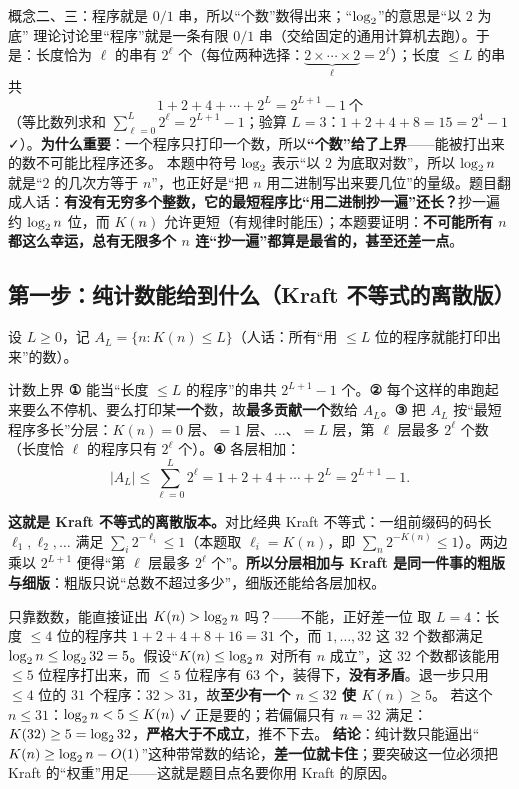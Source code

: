\documentclass[11pt,a4paper]{ctexart}
\begin{document}
\begin{defbox}{概念二、三：程序就是 $0/1$ 串，所以“个数”数得出来；“$\log_{2}$”的意思是“以 $2$ 为底”}
理论讨论里“程序”就是一条有限 $0/1$ 串（交给固定的通用计算机去跑）。于是：长度恰为 $\ell$ 的串有 $2^{\ell}$ 个（每位两种选择：$\underbrace{2\times\cdots\times2}_{\ell}=2^{\ell}$）；长度 $\le L$ 的串共
\[
1+2+4+\cdots+2^{L}=2^{L+1}-1\ \text{个}
\]
（等比数列求和 $\sum_{\ell=0}^{L}2^{\ell}=2^{L+1}-1$；验算 $L=3$：$1+2+4+8=15=2^{4}-1$ ✓）。\textbf{为什么重要}：一个程序只打印一个数，所以\textbf{“个数”给了上界}——能被打出来的数不可能比程序还多。
本题中符号 $\log_{2}$ 表示“以 $2$ 为底取对数”，所以 $\log_{2} n$ 就是“$2$ 的几次方等于 $n$”，也正好是“把 $n$ 用二进制写出来要几位”的量级。题目翻成人话：\textbf{有没有无穷多个整数，它的最短程序比“用二进制抄一遍”还长？}抄一遍约 $\log_{2} n$ 位，而 $K(n)$ 允许更短（有规律时能压）；本题要证明：\textbf{不可能所有 $n$ 都这么幸运，总有无限多个 $n$ 连“抄一遍”都算是最省的，甚至还差一点}。
\end{defbox}

\subsection{第一步：纯计数能给到什么（Kraft 不等式的离散版）}

设 $L\ge0$，记 $A_L=\{n: K(n)\le L\}$（人话：所有“用 $\le L$ 位的程序就能打印出来”的数）。

\begin{calc}{计数上界}
\textbf{①} 能当“长度 $\le L$ 的程序”的串共 $2^{L+1}-1$ 个。\textbf{②} 每个这样的串跑起来要么不停机、要么打印某\textbf{一个}数，故\textbf{最多贡献一个}数给 $A_L$。\textbf{③} 把 $A_L$ 按“最短程序多长”分层：$K(n)=0$ 层、$=1$ 层、$\dots$、$=L$ 层，第 $\ell$ 层最多 $2^{\ell}$ 个数（长度恰 $\ell$ 的程序只有 $2^{\ell}$ 个）。\textbf{④} 各层相加：
\[
|A_L|\le\sum_{\ell=0}^{L}2^{\ell}=1+2+4+\cdots+2^{L}=2^{L+1}-1 .
\]
\end{calc}

\textbf{这就是 Kraft 不等式的离散版本。}对比经典 Kraft 不等式：一组前缀码的码长 $\ell_1,\ell_2,\dots$ 满足 $\sum_i2^{-\ell_i}\le1$（本题取 $\ell_i=K(n)$，即 $\sum_n2^{-K(n)}\le1$）。两边乘以 $2^{L+1}$ 便得“第 $\ell$ 层最多 $2^{\ell}$ 个”。\textbf{所以分层相加与 Kraft 是同一件事的粗版与细版}：粗版只说“总数不超过多少”，细版还能给各层加权。

\begin{qa}{只靠数数，能直接证出 $K(n)>\log_{2} n$ 吗？——不能，正好差一位}
取 $L=4$：长度 $\le4$ 位的程序共 $1+2+4+8+16=31$ 个，而 $1,\dots,32$ 这 $32$ 个数都满足 $\log_{2} n\le\log_{2}32=5$。假设“$K(n)\le\log_{2} n$ 对所有 $n$ 成立”，这 $32$ 个数都该能用 $\le5$ 位程序打出来，而 $\le5$ 位程序有 $63$ 个，装得下，\textbf{没有矛盾}。退一步只用 $\le4$ 位的 $31$ 个程序：$32>31$，故\textbf{至少有一个 $n\le32$ 使 $K(n)\ge5$}。
若这个 $n\le31$：$\log_{2} n<5\le K(n)$ ✓ 正是要的；若偏偏只有 $n=32$ 满足：$K(32)\ge5=\log_{2}32$，\textbf{严格大于不成立}，推不下去。
\textbf{结论}：纯计数只能逼出“$K(n)\ge\log_{2} n-O(1)$”这种带常数的结论，\textbf{差一位就卡住}；要突破这一位必须把 Kraft 的“权重”用足——这就是题目点名要你用 Kraft 的原因。
\end{qa}
\end{document}
